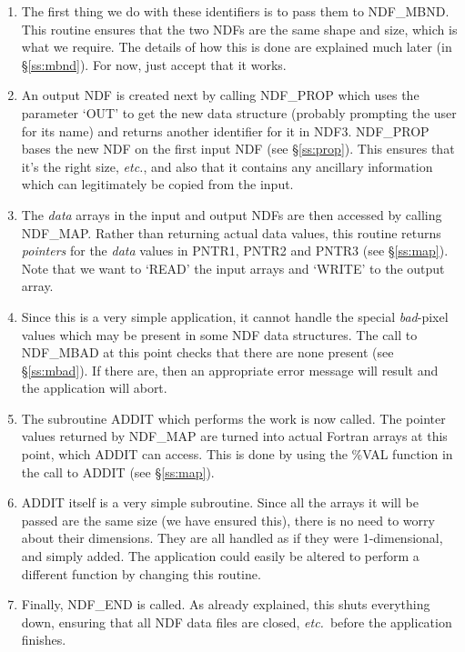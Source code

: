 \documentclass[twoside,11pt]{article}
\newcommand{\htmlref}[2]{#1}
\newcommand{\st}[1]{{\em{#1}}}
\begin{document}
\begin{enumerate}
\item The first thing we do with these identifiers is to pass them to
\htmlref{NDF\_MBND}{NDF_MBND}. 
This routine ensures that the two NDFs are the same shape and size, which is 
what we require.
The details of how this is done are explained much later (in
\S\ref{ss:mbnd}). 
For now, just accept that it works. 

\item An output NDF is created next by calling \htmlref{NDF\_PROP}{NDF_PROP} which uses the
parameter `OUT' to get the new data structure (probably prompting the
user for its name) and returns another identifier for it in NDF3. 
NDF\_PROP bases the new NDF on the first input NDF (see \S\ref{ss:prop}).
This ensures that it's the right size, \st{etc.}, and also that it contains
any ancillary information which can legitimately be copied from the input. 

\item The \st{data\/} arrays in the input and output NDFs are then accessed
by calling \htmlref{NDF\_MAP}{NDF_MAP}. 
Rather than returning actual data values, this routine returns
\st{pointers\/} for the \st{data\/} values in PNTR1, PNTR2 and PNTR3
(see 
\S\ref{ss:map}). 
Note that we want to `READ' the input arrays and `WRITE' to the output array.

\item Since this is a very simple application, it cannot handle the special
\st{bad\/}-pixel values which may be present in some NDF data structures. 
The call to \htmlref{NDF\_MBAD}{NDF_MBAD} at this point checks that there are none present (see 
\S\ref{ss:mbad}).
If there are, then an appropriate error message will result and the application
will abort. 

\item The subroutine ADDIT which performs the work is now called. 
The pointer values returned by NDF\_MAP are turned into actual Fortran
arrays at this point, which ADDIT can access. 
This is done by using the \%VAL function in the call to ADDIT (see
\S\ref{ss:map}). 

\item ADDIT itself is a very simple subroutine.
Since all the arrays it will be passed are the same size (we have ensured 
this), there is no need to worry about their dimensions.
They are all handled as if they were 1-dimensional, and simply added.
The application could easily be altered to perform a different function by
changing this routine.

\item Finally, NDF\_END is called.
As already explained, this shuts everything down, ensuring that all NDF data
files are closed, \st{etc.}\ before the application finishes. 

\end{enumerate}
\end{document}
